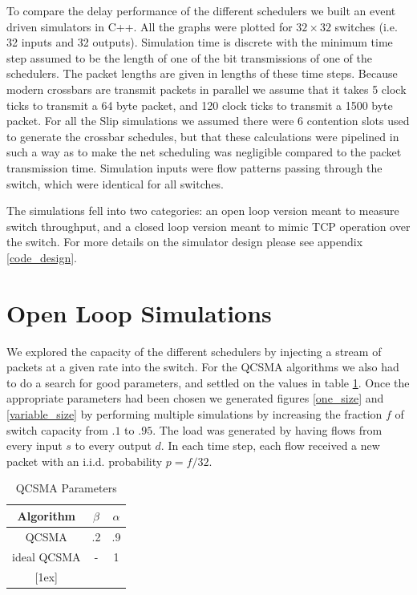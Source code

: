 \documentclass{IEEEtran}%
\begin{document}
To compare the delay performance of the different schedulers we built an event driven simulators in C++.  All the graphs were plotted for $32 \times 32$ switches (i.e. 32 inputs and 32 outputs).  Simulation time is discrete with the minimum time step assumed to be the length of one of the bit transmissions of one of the schedulers.   The packet lengths are given in lengths of these time steps.  Because modern crossbars are transmit packets in parallel we assume that it takes 5 clock ticks to transmit a 64 byte packet, and 120 clock ticks to transmit a 1500 byte packet.  For all the Slip simulations we assumed there were $6$ contention slots used to generate the crossbar schedules, but that these calculations were pipelined in such a way as to make the net scheduling was negligible compared to the packet transmission time.  Simulation inputs were flow patterns passing through the switch, which were identical for all switches. %

 The simulations fell into two categories: an open loop version meant to measure switch throughput, and a closed loop version meant to mimic TCP operation over the switch.  For more details on the simulator design please see appendix \ref{code_design}.%
 
\section{Open Loop Simulations} \label{open}

We explored the capacity of the different schedulers by injecting a stream of packets at a given rate into the switch.  For the QCSMA algorithms we also had to do a search for good parameters, and settled on the values in table \ref{qcsma_parameters}.  Once the appropriate parameters had been chosen we generated figures \ref{one_size} and \ref{variable_size} by performing multiple simulations by increasing the fraction $f$ of switch capacity from $.1$ to $.95$.  The load was generated by having flows from every input $s$ to every output $d$.  In each time step, each flow received a new packet with an i.i.d. probability $p=f/32$.

\begin{table}[ht] \caption{QCSMA Parameters} 
\centering 
\begin{tabular}{c c c}
 \hline\hline 
 Algorithm & $\beta$ & $\alpha$ \\
  [0.5ex] \hline 
   QCSMA&.2&.9  \\
   ideal  QCSMA&-&1  \\
  [1ex] \hline 
  \end{tabular}
   \label{qcsma_parameters} 
\end{table}
\end{document}
